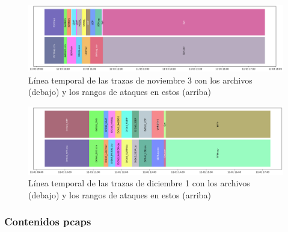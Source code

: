 \begin{figure}[H]
    \begin{center}
        \includegraphics[width=1\linewidth]{media/cicddos_2019_csv_03-11_timeline.png}
    \end{center}
    \captionsetup{justification=centering}
    \caption{Línea temporal de las trazas de noviembre 3 con los archivos (debajo) y los rangos de ataques en estos (arriba)}\label{fig:cicddos_2019_csv_03-11_timeline}
\end{figure}
\begin{figure}[H]
    \begin{center}
        \includegraphics[width=1\linewidth]{media/cicddos_2019_csv_01-12_timeline.png}
    \end{center}
    \captionsetup{justification=centering}
    \caption{Línea temporal de las trazas de diciembre 1 con los archivos (debajo) y los rangos de ataques en estos (arriba)}\label{fig:cicddos_2019_csv_01-12_timeline}
\end{figure}


\subsubsection{Contenidos pcaps}

